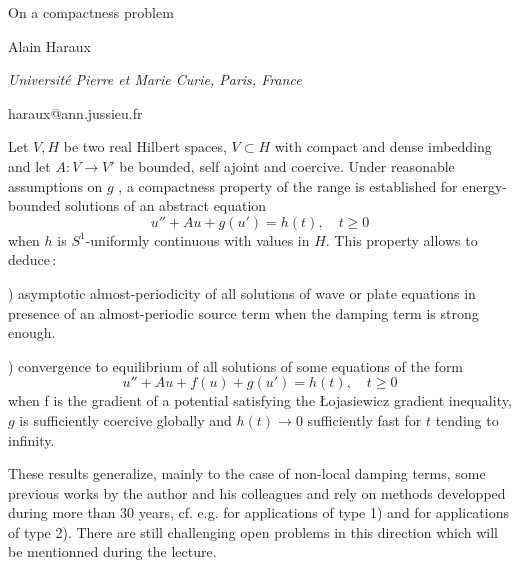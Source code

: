 \documentclass[10pt,a4paper]{article}
\begin{document}
\begin{center}

{\Large On a compactness problem}

\bigskip

{\sc Alain Haraux}

{\small\it Universit{\'e} Pierre et Marie Curie, Paris, France}

{\small\rm haraux@ann.jussieu.fr}




\end{center}

\bigskip


Let $V,  H $  be two real Hilbert spaces,  $V\subset H$ with compact and dense imbedding and let $A: V\rightarrow V' $ be bounded, self ajoint and coercive.  Under reasonable assumptions on $g$ , a  compactness property of the range is established for energy-bounded solutions of an abstract equation 
$$ u'' + Au + g(u') = h(t), \quad t\ge 0$$ when $h$ is $S^1$-uniformly continuous with values in $H$. This property allows to deduce\,:\smallskip

) asymptotic almost-periodicity of all solutions of wave or plate equations in presence of an almost-periodic source term when the damping term is strong enough.
\smallskip

) convergence to equilibrium of all solutions of some equations of the form 
$$ u'' + Au + f(u) + g(u') = h(t), \quad t\ge 0$$ when f is the gradient of a potential satisfying the {\L}ojasiewicz gradient inequality, $g$ is sufficiently coercive globally and $h(t) \rightarrow 0$  sufficiently fast for $t$ tending to infinity. 

\smallskip

These results generalize, mainly to the case of non-local damping terms,  some previous works by the author and his colleagues and rely on methods developped during more than 30 years, cf. e.g. \cite{haraux1, haraux2, haraux3} for applications of type 1) and \cite{haraux4,haraux5} for applications of type 2). There are still challenging open problems in this direction which will be mentionned during the lecture.
\end{document}
